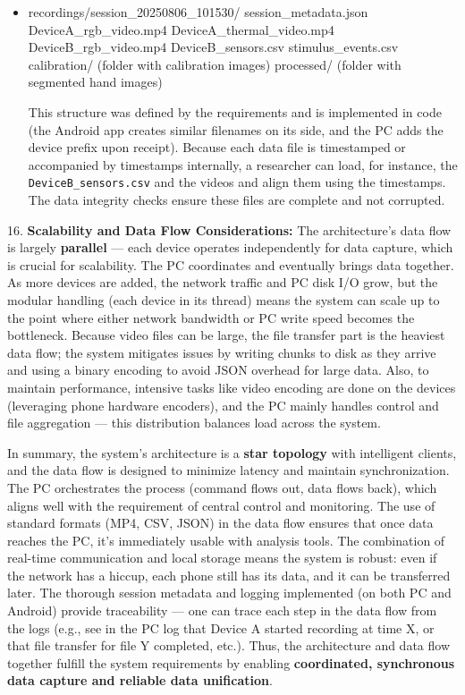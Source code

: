 \begin{itemize}
\item recordings/session_20250806_101530/
        session_metadata.json
        DeviceA_rgb_video.mp4
        DeviceA_thermal_video.mp4
        DeviceB_rgb_video.mp4
        DeviceB_sensors.csv
        stimulus_events.csv
        calibration/ (folder with calibration images)
        processed/ (folder with segmented hand images)

  This structure was defined by the requirements and is implemented in
  code (the Android app creates similar filenames on its
  side\cite{ref62},
  and the PC adds the device prefix upon receipt). Because each data
  file is timestamped or accompanied by timestamps internally, a
  researcher can load, for instance, the \texttt{DeviceB_sensors.csv} and the
  videos and align them using the timestamps. The data integrity checks
  ensure these files are complete and not corrupted.

\end{itemize}
16. \textbf{Scalability and Data Flow Considerations:} The architecture's
    data flow is largely \textbf{parallel} --- each device operates
    independently for data capture, which is crucial for scalability.
    The PC coordinates and eventually brings data together. As more
    devices are added, the network traffic and PC disk I/O grow, but the
    modular handling (each device in its thread) means the system can
    scale up to the point where either network bandwidth or PC write
    speed becomes the bottleneck. Because video files can be large, the
    file transfer part is the heaviest data flow; the system mitigates
    issues by writing chunks to disk as they arrive and using a binary
    encoding to avoid JSON overhead for large
    data\cite{ref50}.
    Also, to maintain performance, intensive tasks like video encoding
    are done on the devices (leveraging phone hardware encoders), and
    the PC mainly handles control and file aggregation --- this
    distribution balances load across the system.

In summary, the system's architecture is a \textbf{star topology} with
intelligent clients, and the data flow is designed to minimize latency
and maintain synchronization. The PC orchestrates the process (command
flows out, data flows back), which aligns well with the requirement of
central control and monitoring. The use of standard formats (MP4, CSV,
JSON) in the data flow ensures that once data reaches the PC, it's
immediately usable with analysis tools. The combination of real-time
communication and local storage means the system is robust: even if the
network has a hiccup, each phone still has its data, and it can be
transferred later. The thorough session metadata and logging implemented
(on both PC and Android) provide traceability --- one can trace each step
in the data flow from the logs (e.g., see in the PC log that Device A
started recording at time X, or that file transfer for file Y completed,
etc.). Thus, the architecture and data flow together fulfill the system
requirements by enabling \textbf{coordinated, synchronous data capture and
reliable data unification}.

